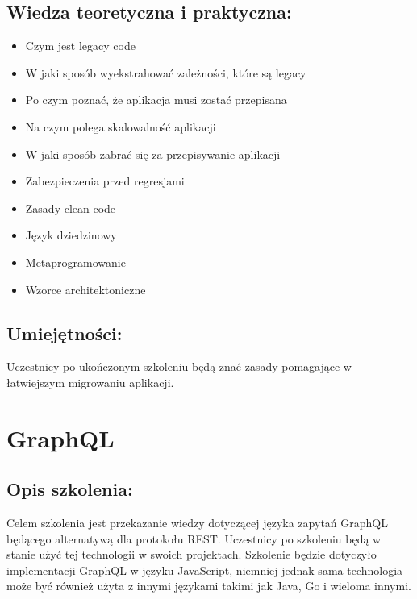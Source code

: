 \documentclass{article}[10pt]
\begin{document}
	\subsection*{Wiedza teoretyczna i praktyczna:}
\begin{adjustwidth}{1.5cm}{}
	\begin{itemize}
		\item Czym jest legacy code
		\item W jaki sposób wyekstrahować zależności, które są legacy
		\item Po czym poznać, że aplikacja musi zostać przepisana
		\item Na czym polega skalowalność aplikacji
		\item W jaki sposób zabrać się za przepisywanie aplikacji
		\item Zabezpieczenia przed regresjami
		\item Zasady clean code
		\item Język dziedzinowy
		\item Metaprogramowanie
		\item Wzorce architektoniczne
	\end{itemize}
\end{adjustwidth}

	\subsection*{Umiejętności:}
\begin{adjustwidth}{2cm}{}
\justifying
	
Uczestnicy po ukończonym szkoleniu będą znać zasady pomagające w łatwiejszym migrowaniu aplikacji.

\end{adjustwidth}

\newpage


    
	\section{GraphQL}

	\subsection*{Opis szkolenia:}
	\begin{adjustwidth}{2cm}{}
\justifying
		
Celem szkolenia jest przekazanie wiedzy dotyczącej języka zapytań GraphQL będącego alternatywą dla protokołu REST. Uczestnicy po szkoleniu będą w stanie użyć tej technologii w swoich projektach. Szkolenie będzie dotyczyło implementacji GraphQL w języku JavaScript, niemniej jednak sama technologia może być również użyta z innymi językami takimi jak Java, Go i wieloma innymi.
	\end{adjustwidth}
\end{document}
